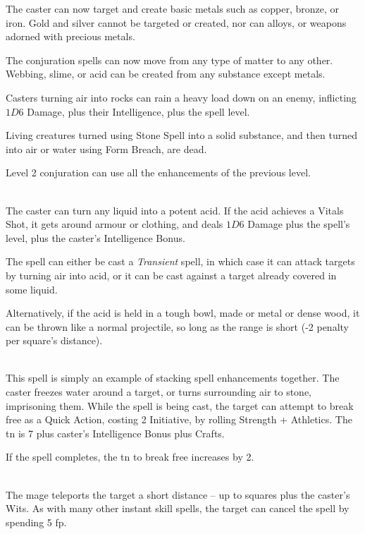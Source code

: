 \begin{multicols}{2}
The caster can now target and create basic metals such as copper, bronze, or iron.  Gold and silver cannot be targeted or created, nor can alloys, or weapons adorned with precious metals.

The conjuration spells can now move from any type of matter to any other.  Webbing, slime, or acid can be created from any substance except metals.

Casters turning air into rocks can rain a heavy load down on an enemy, inflicting $1D6$ Damage, plus their Intelligence, plus the spell level.

Living creatures turned using Stone Spell into a solid substance, and then turned into air or water using Form Breach, are dead.

\spelllevel

Level 2 conjuration can use all the enhancements of the previous level.

\\
The caster can turn any liquid into a potent acid.
If the acid achieves a Vitals Shot, it gets around armour or clothing, and deals $1D6$ Damage plus the spell's level, plus the caster's Intelligence Bonus.

The spell can either be cast a \textit{Transient} spell, in which case it can attack targets by turning air into acid, or it can be cast against a target already covered in some liquid.

Alternatively, if the acid is held in a tough bowl, made or metal or dense wood, it can be thrown like a normal projectile, so long as the range is short (-2 penalty per square's distance).

\\
This spell is simply an example of stacking spell enhancements together.  The caster freezes water around a target, or turns surrounding air to stone, imprisoning them.
While the spell is being cast, the target can attempt to break free as a Quick Action, costing 2 Initiative, by rolling Strength + Athletics.
The \gls{tn} is 7 plus caster's Intelligence Bonus plus Crafts.

If the spell completes, the \gls{tn} to break free increases by 2.

\spelllevel

\\
The mage teleports the target a short distance -- up to  squares plus the caster's Wits.  As with many other instant skill spells, the target can cancel the spell by spending 5 \gls{fp}.


\end{multicols}
